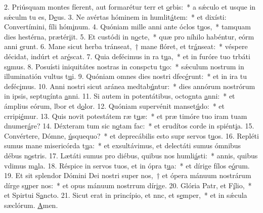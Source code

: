2. Priúsquam montes fíerent, aut formarétur terr et \uline{o}rbis:~* a sǽculo et usque in sǽculm tu es, D\uline{e}us.
3. Ne avértas hóminem in humlit\uline{á}tem:~* et dixísti: Convertímini, fíli hóm\uline{i}num.
4. Quóniam mille anni ante óclos t\uline{u}os,~* tamquam dies hestérna,  prætér\uline{i}it.
5. Et custódi in n\uline{o}cte,~* quæ pro níhilo habéntur, eórm anni \uline{e}runt.
6. Mane sicut herba tránseat,~† mane flóret, et tr\uline{á}nseat:~* véspere décidat, indúrt et ar\uline{é}scat.
7. Quia defécimus in ra t\uline{u}a,~* et in furóre tuo trbáti s\uline{u}mus.
8. Posuísti iniquitátes nostras in conspctu t\uline{u}o:~* sǽculum nostrum in illuminatión vultus t\uline{u}i.
9. Quóniam omnes dies nostri dfec\uline{é}runt:~* et in ira tu deféc\uline{i}mus.
10. Anni nostri sicut aránea medtab\uline{ú}ntur:~* dies annórum nostrórum in ipsis, septugínta \uline{a}nni.
11. Si autem in potentátibus, octognta \uline{a}nni:~* et ámplius eórum, lbor et d\uline{o}lor.
12. Quóniam supervénit manset\uline{ú}do:~* et crripi\uline{é}mur.
13. Quis novit potestátem ræ t\uline{u}æ:~* et præ timóre tuo iram tuam dnumer\uline{á}re?
14. Déxteram tum sic n\uline{o}tam fac:~* et erudítos corde in spiént\uline{i}a.
15. Convértere, Dómne, \uline{ú}squequo?~* et deprecábilis esto supr servos t\uline{u}os.
16. Repléti sumus mane misericórda t\uline{u}a:~* et exsultávimus, et delectáti sumus ómnibus débus n\uline{o}stris.
17. Lætáti sumus pro diébus, quibus nos humli\uline{á}sti:~* annis, quibus vdimus m\uline{a}la.
18. Réspice in servos tuos, et in ópra t\uline{u}a:~* et dírige fílos e\uline{ó}rum.
19. Et sit splendor Dómini Dei nostri super nos,~† et ópera mánuum nostrárum dírge s\uline{u}per nos:~* et opus mánuum nostrrum dír\uline{i}ge.
20. Glória Patr, et F\uline{í}lio,~* et Spirtui S\uline{a}ncto.
21. Sicut erat in princípio, et nnc, et s\uline{e}mper,~* et in sǽcula sæclórum. \uline{A}men.
